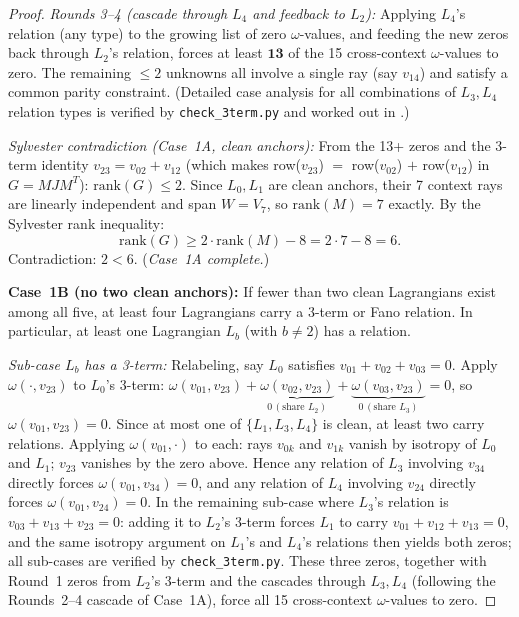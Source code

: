 \documentclass[11pt,a4paper]{article}
\theoremstyle{remark}
\begin{document}
\begin{proof}
\textit{Rounds 3--4 (cascade through $L_4$ and feedback to $L_2$):}
Applying $L_4$'s relation (any type) to the growing list of zero $\omega$-values,
and feeding the new zeros back through $L_2$'s relation, forces at least
$\mathbf{13}$ of the 15 cross-context $\omega$-values to zero.
The remaining $\leq 2$ unknowns all involve a single ray
(say $v_{14}$) and satisfy a common parity constraint.
(Detailed case analysis for all combinations of $L_3, L_4$ relation types
is verified by \texttt{check\_3term.py} and worked out in \cite{PaperXVIIIsuppl}.)

\textit{Sylvester contradiction (Case~1A, clean anchors):}
From the 13+ zeros and the 3-term identity $v_{23} = v_{02} + v_{12}$
(which makes row($v_{23}$) $=$ row($v_{02}$) $+$ row($v_{12}$) in $G = MJM^T$):
$\mathrm{rank}(G) \leq 2$.
Since $L_0, L_1$ are clean anchors, their 7 context rays are linearly independent
and span $W = V_7$, so $\mathrm{rank}(M) = 7$ exactly.
By the Sylvester rank inequality:
\[
  \mathrm{rank}(G) \geq 2 \cdot \mathrm{rank}(M) - 8 = 2 \cdot 7 - 8 = 6.
\]
Contradiction: $2 < 6$. \quad (\textit{Case~1A complete.})

\medskip
\noindent\textbf{Case~1B (no two clean anchors):}
If fewer than two clean Lagrangians exist among all five, at least four Lagrangians
carry a 3-term or Fano relation.
In particular, at least one Lagrangian $L_b$ (with $b \neq 2$) has a relation.

\textit{Sub-case $L_b$ has a 3-term:}
Relabeling, say $L_0$ satisfies $v_{01} + v_{02} + v_{03} = 0$.
Apply $\omega(\cdot, v_{23})$ to $L_0$'s 3-term:
$\omega(v_{01}, v_{23}) + \underbrace{\omega(v_{02}, v_{23})}_{0\,(\text{share }L_2)}
+ \underbrace{\omega(v_{03}, v_{23})}_{0\,(\text{share }L_3)} = 0$,
so $\omega(v_{01}, v_{23}) = 0$.
Since at most one of $\{L_1, L_3, L_4\}$ is clean, at least two carry relations.
Applying $\omega(v_{01}, \cdot)$ to each: rays $v_{0k}$ and $v_{1k}$ vanish by
isotropy of $L_0$ and $L_1$; $v_{23}$ vanishes by the zero above.
Hence any relation of $L_3$ involving $v_{34}$ directly forces $\omega(v_{01},v_{34})=0$,
and any relation of $L_4$ involving $v_{24}$ directly forces $\omega(v_{01},v_{24})=0$.
In the remaining sub-case where $L_3$'s relation is $v_{03}+v_{13}+v_{23}=0$:
adding it to $L_2$'s 3-term forces $L_1$ to carry $v_{01}+v_{12}+v_{13}=0$,
and the same isotropy argument on $L_1$'s and $L_4$'s relations then yields both zeros;
all sub-cases are verified by \texttt{check\_3term.py}.
These three zeros, together with Round~1 zeros from $L_2$'s 3-term and the cascades
through $L_3, L_4$ (following the Rounds~2--4 cascade of Case~1A), force all 15 cross-context
$\omega$-values to zero.


\end{proof}
\end{document}
